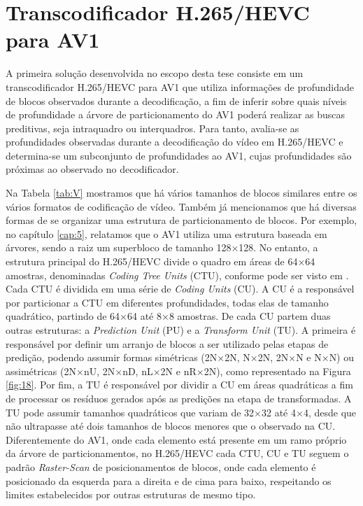 \section{Transcodificador H.265/HEVC para AV1}
\label{cap:6.1}

A primeira solução desenvolvida no escopo desta tese consiste em um transcodificador H.265/HEVC para AV1 que utiliza informações de profundidade de blocos observados durante a decodificação, a fim de inferir sobre quais níveis de profundidade a árvore de particionamento do AV1 poderá realizar as buscas preditivas, seja intraquadro ou interquadros. Para tanto, avalia-se as profundidades observadas durante a decodificação do vídeo em H.265/HEVC e determina-se um subconjunto de profundidades ao AV1, cujas profundidades são próximas ao observado no decodificador. 

Na Tabela \ref{tab:V} mostramos que há vários tamanhos de blocos similares entre os vários formatos de codificação de vídeo. Também já mencionamos que há diversas formas de se organizar uma estrutura de particionamento de blocos. Por exemplo, no capítulo \ref{cap:5}, relatamos que o AV1 utiliza uma estrutura baseada em árvores, sendo a raiz um superbloco de tamanho 128$\times$128. No entanto, a estrutura principal do H.265/HEVC divide o quadro em áreas de 64$\times$64 amostras, denominadas \textit{Coding Tree Units} (CTU), conforme pode ser visto em \citet{bib:hevc}. Cada CTU é dividida em uma série de \textit{Coding Units} (CU). A CU é a responsável por particionar a CTU em diferentes profundidades, todas elas de tamanho quadrático, partindo de 64$\times$64 até 8$\times$8 amostras. De cada CU partem duas outras estruturas: a \textit{Prediction Unit} (PU) e a \textit{Transform Unit} (TU). A primeira é responsável por definir um arranjo de blocos a ser utilizado pelas etapas de predição, podendo assumir formas simétricas (2N$\times$2N, N$\times$2N, 2N$\times$N e N$\times$N) ou assimétricas (2N$\times$nU, 2N$\times$nD, nL$\times$2N e nR$\times$2N), como representado na Figura \ref{fig:18}. Por fim, a TU é responsável por dividir a CU em áreas quadráticas a fim de processar os resíduos gerados após as predições na etapa de transformadas. A TU pode assumir tamanhos quadráticos que variam de 32$\times$32 até 4$\times$4, desde que não ultrapasse até dois tamanhos de blocos menores que o observado na CU. Diferentemente do AV1, onde cada elemento está presente em um ramo próprio da árvore de particionamentos, no H.265/HEVC cada CTU, CU e TU seguem o padrão \textit{Raster-Scan} \cite{bib:raster} de posicionamentos de blocos, onde cada elemento é posicionado da esquerda para a direita e de cima para baixo, respeitando os limites estabelecidos por outras estruturas de mesmo tipo. 

